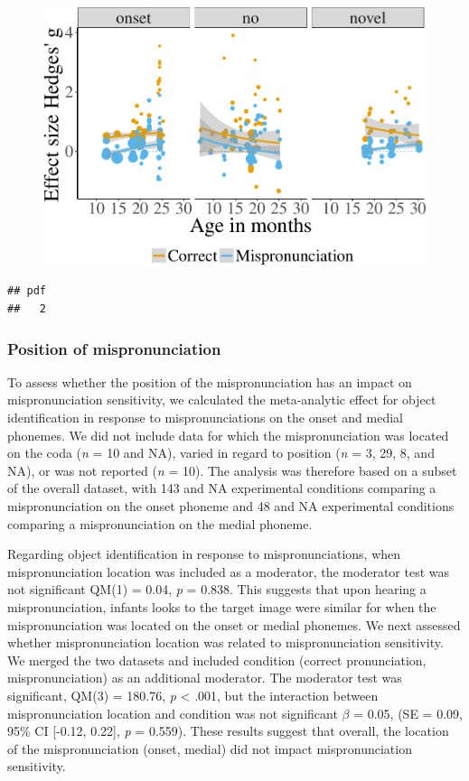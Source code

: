 \documentclass[man]{apa6}
\theoremstyle{definition}
\theoremstyle{definition}
\theoremstyle{definition}
\theoremstyle{remark}
\begin{document}
\begin{figure}[htbp]
\centering
\includegraphics{Paper_Analyses_files/figure-latex/PlotDistOverlap_cond_age-1.pdf}
\caption{}
\end{figure}

\begin{verbatim}
## pdf 
##   2
\end{verbatim}

\subsubsection{Position of
mispronunciation}\label{position-of-mispronunciation}

To assess whether the position of the mispronunciation has an impact on
mispronunciation sensitivity, we calculated the meta-analytic effect for
object identification in response to mispronunciations on the onset and
medial phonemes. We did not include data for which the mispronunciation
was located on the coda (\emph{n} = 10 and NA), varied in regard to
position (\emph{n} = 3, 29, 8, and NA), or was not reported (\emph{n} =
10). The analysis was therefore based on a subset of the overall
dataset, with 143 and NA experimental conditions comparing a
mispronunciation on the onset phoneme and 48 and NA experimental
conditions comparing a mispronunciation on the medial phoneme.

Regarding object identification in response to mispronunciations, when
mispronunciation location was included as a moderator, the moderator
test was not significant QM(1) = 0.04, \emph{p} = 0.838. This suggests
that upon hearing a mispronunciation, infants looks to the target image
were similar for when the mispronunciation was located on the onset or
medial phonemes. We next assessed whether mispronunciation location was
related to mispronunciation sensitivity. We merged the two datasets and
included condition (correct pronunciation, mispronunciation) as an
additional moderator. The moderator test was significant, QM(3) =
180.76, \emph{p} \textless{} .001, but the interaction between
mispronunciation location and condition was not significant \(\beta\) =
0.05, (SE = 0.09, 95\% CI {[}-0.12, 0.22{]}, \emph{p} = 0.559). These
results suggest that overall, the location of the mispronunciation
(onset, medial) did not impact mispronunciation sensitivity.
\end{document}
